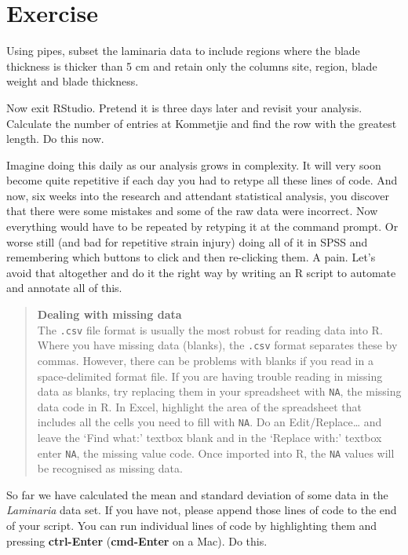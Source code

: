 \documentclass[
]{book}
\begin{document}
\hypertarget{exercise-1}{%
\section{Exercise}\label{exercise-1}}

Using pipes, subset the laminaria data to include regions where the blade thickness is thicker than 5 cm and retain only the columns site, region, blade weight and blade thickness.

Now exit RStudio. Pretend it is three days later and revisit your analysis. Calculate the number of entries at Kommetjie and find the row with the greatest length. Do this now.

Imagine doing this daily as our analysis grows in complexity. It will very soon become quite repetitive if each day you had to retype all these lines of code. And now, six weeks into the research and attendant statistical analysis, you discover that there were some mistakes and some of the raw data were incorrect. Now everything would have to be repeated by retyping it at the command prompt. Or worse still (and bad for repetitive strain injury) doing all of it in SPSS and remembering which buttons to click and then re-clicking them. A pain. Let's avoid that altogether and do it the right way by writing an R script to automate and annotate all of this.

\begin{quote}
\textbf{Dealing with missing data}\\
The \texttt{.csv} file format is usually the most robust for reading data into R. Where you have missing data (blanks), the \texttt{.csv} format separates these by commas. However, there can be problems with blanks if you read in a space-delimited format file. If you are having trouble reading in missing data as blanks, try replacing them in your spreadsheet with \texttt{NA}, the missing data code in R. In Excel, highlight the area of the spreadsheet that includes all the cells you need to fill with \texttt{NA}. Do an Edit/Replace\ldots{} and leave the `Find what:' textbox blank and in the `Replace with:' textbox enter \texttt{NA}, the missing value code. Once imported into R, the \texttt{NA} values will be recognised as missing data.
\end{quote}

So far we have calculated the mean and standard deviation of some data in the \emph{Laminaria} data set. If you have not, please append those lines of code to the end of your script. You can run individual lines of code by highlighting them and pressing \textbf{ctrl-Enter} (\textbf{cmd-Enter} on a Mac). Do this.
\end{document}
